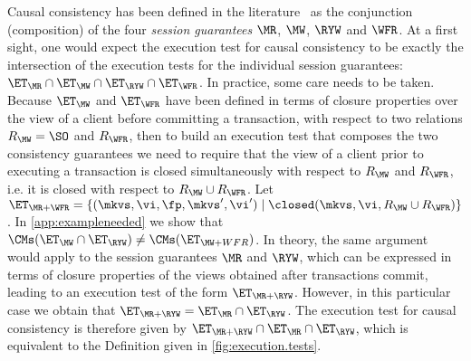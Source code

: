 Causal consistency has been defined in the literature~\cite{session2causal} 
as the conjunction (composition) of the four \emph{session guarantees} \(\MR\), \(\MW\), \(\RYW\) and \(\WFR\). 
At a first sight, one would expect the execution test for causal consistency to be exactly 
the intersection of the execution tests for the individual session guarantees: $\ET_{\MR} \cap \ET_{\MW} \cap \ET_{\RYW} \cap 
\ET_{\WFR}$. In practice, some care needs to be taken. Because $\ET_{\MW}$ and $\ET_{\WFR}$ have been 
defined in terms of closure properties over the view of a client before committing a transaction, with respect 
to two relations $R_{\MW} = \SO$ and $R_{\WFR}$, then to build an execution test that composes the two 
consistency guarantees we need to require that the view of a client prior to executing a transaction is 
closed simultaneously with respect to $R_{\MW}$ and $R_{\WFR}$, i.e. it is closed with respect to 
$R_{\MW} \cup R_{\WFR}$. Let $\ET_{\MR+\WFR} = \{(\mkvs, \vi, \fp, \mkvs', \vi') \mid \closed(\mkvs, \vi, R_{\MW} \cup R_{\WFR})\}$. 
In \cref{app:exampleneeded} we show that $\CMs(\ET_{\MW} \cap \ET_{\RYW}) \neq \CMs(\ET_{\MW+WFR})$. 
In theory, the same argument would apply to the session guarantees $\MR$ and $\RYW$, which 
can be expressed in terms of closure properties of the views obtained after transactions commit, leading 
to an execution test of the form $\ET_{\MR+\RYW}$. However, in this particular case we obtain that 
$\ET_{\MR+\RYW} = \ET_{\MR} \cap \ET_{\RYW}$. The execution test for causal consistency is therefore 
given by $\ET_{\MR+\RYW} \cap \ET_{\MR} \cap \ET_{\RYW}$, which is equivalent to the Definition given in 
\ref{fig:execution.tests}.


